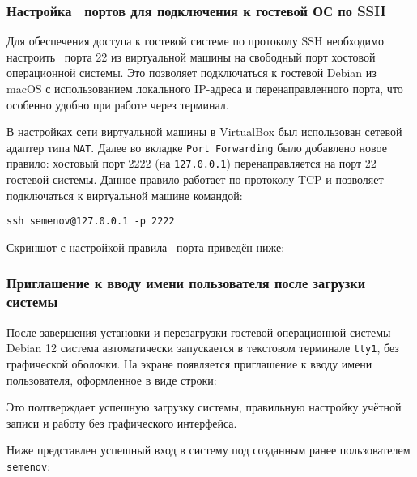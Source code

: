 
\subsubsection*{Настройка \frqq\ портов для подключения к гостевой ОС по SSH}

Для обеспечения доступа к гостевой системе по протоколу SSH необходимо настроить \frqq\ порта 22 из виртуальной машины на свободный порт хостовой операционной системы. Это позволяет подключаться к гостевой Debian из macOS с использованием локального IP-адреса и перенаправленного порта, что особенно удобно при работе через терминал.

В настройках сети виртуальной машины в VirtualBox был использован сетевой адаптер типа \texttt{NAT}. Далее во вкладке \texttt{Port Forwarding} было добавлено новое правило: хостовый порт 2222 (на \texttt{127.0.0.1}) перенаправляется на порт 22 гостевой системы. Данное правило работает по протоколу TCP и позволяет подключаться к виртуальной машине командой:

\begin{verbatim}
ssh semenov@127.0.0.1 -p 2222
\end{verbatim}

Скриншот с настройкой правила \frqq\ порта приведён ниже:


\subsubsection*{Приглашение к вводу имени пользователя после загрузки системы}

После завершения установки и перезагрузки гостевой операционной системы Debian 12 система автоматически запускается в текстовом терминале \texttt{tty1}, без графической оболочки. На экране появляется приглашение к вводу имени пользователя, оформленное в виде строки:


Это подтверждает успешную загрузку системы, правильную настройку учётной записи и работу без графического интерфейса.

Ниже представлен успешный вход в систему под созданным ранее пользователем \texttt{semenov}:


